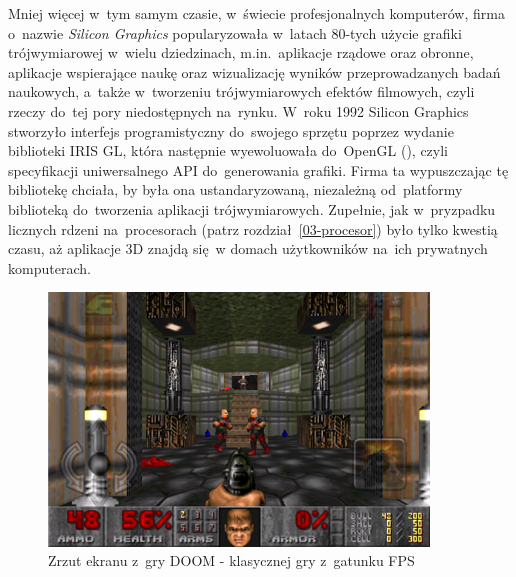 Mniej więcej w~tym samym czasie, w~świecie profesjonalnych komputerów, firma o~nazwie \emph{Silicon Graphics} popularyzowała w~latach 80-tych użycie grafiki trójwymiarowej w~wielu dziedzinach, m.in.~aplikacje rządowe oraz obronne, aplikacje wspierające naukę oraz wizualizację wyników przeprowadzanych badań naukowych, a~także w~tworzeniu trójwymiarowych efektów filmowych, czyli rzeczy do~tej pory niedostępnych na~rynku. W~roku 1992 Silicon Graphics stworzyło interfejs programistyczny do~swojego sprzętu poprzez wydanie biblioteki IRIS GL, która następnie wyewoluowała do~OpenGL (), czyli specyfikacji uniwersalnego API do~generowania grafiki. Firma ta wypuszczając tę bibliotekę chciała, by była ona ustandaryzowaną, niezależną od~platformy biblioteką do~tworzenia aplikacji trójwymiarowych. Zupełnie, jak w~pryzpadku licznych rdzeni na~procesorach (patrz rozdział~\ref{03-procesor}) było tylko kwestią czasu, aż aplikacje 3D znajdą się~w domach użytkowników na~ich prywatnych komputerach.

\begin{figure}[ht]
\centering\includegraphics[width=0.9\textwidth]{figures/03/doom.png}
\caption{Zrzut ekranu z~gry DOOM - klasycznej gry z~gatunku FPS}\label{rys:doom}
\end{figure}

